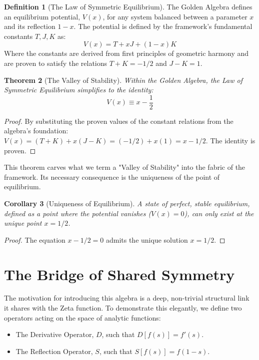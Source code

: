 \documentclass{article}
\theoremstyle{plain}
\newtheorem{theorem}{Theorem}[section]
\newtheorem{corollary}[theorem]{Corollary}
\theoremstyle{definition}
\newtheorem{definition}[theorem]{Definition}
\theoremstyle{remark}
\begin{document}
\begin{definition}[The Law of Symmetric Equilibrium]
The Golden Algebra defines an equilibrium potential, $V(x)$, for any system balanced between a parameter $x$ and its reflection $1-x$. The potential is defined by the framework's fundamental constants $T, J, K$ as:
$$ V(x) = T + xJ + (1-x)K $$
Where the constants are derived from first principles of geometric harmony and are proven to satisfy the relations $T+K = -1/2$ and $J-K=1$.
\end{definition}

\begin{theorem}[The Valley of Stability]
Within the Golden Algebra, the Law of Symmetric Equilibrium simplifies to the identity:
$$ V(x) \equiv x - \frac{1}{2} $$
\end{theorem}
\begin{proof}
By substituting the proven values of the constant relations from the algebra's foundation:
$V(x) = (T+K) + x(J-K) = (-1/2) + x(1) = x - 1/2$. The identity is proven.
\end{proof}

This theorem carves what we term a "Valley of Stability" into the fabric of the framework. Its necessary consequence is the uniqueness of the point of equilibrium.

\begin{corollary}[Uniqueness of Equilibrium]
A state of perfect, stable equilibrium, defined as a point where the potential vanishes ($V(x)=0$), can only exist at the unique point $x=1/2$.
\end{corollary}
\begin{proof}
The equation $x - 1/2 = 0$ admits the unique solution $x=1/2$.
\end{proof}

\section{The Bridge of Shared Symmetry}
\label{sec:bridge}

The motivation for introducing this algebra is a deep, non-trivial structural link it shares with the Zeta function. To demonstrate this elegantly, we define two operators acting on the space of analytic functions:

\begin{itemize}
    \item The Derivative Operator, $D$, such that $D[f(s)] = f'(s)$.
    \item The Reflection Operator, $S$, such that $S[f(s)] = f(1-s)$.
\end{itemize}
\end{document}

